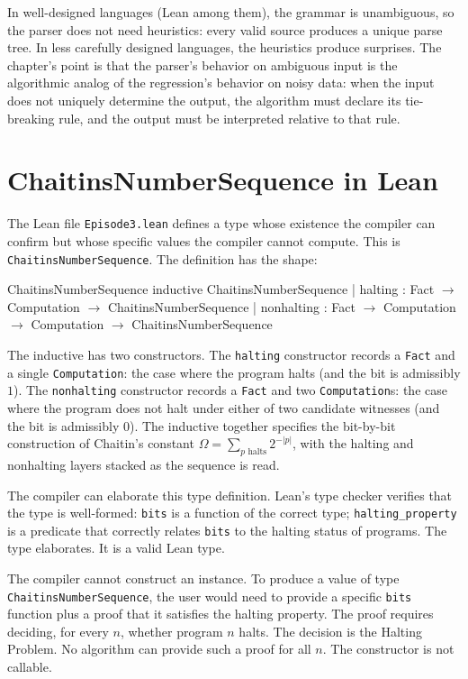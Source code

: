 In well-designed languages (Lean among them), the grammar is
unambiguous, so the parser does not need heuristics: every valid
source produces a unique parse tree. In less carefully designed
languages, the heuristics produce surprises. The chapter's point is
that the parser's behavior on ambiguous input is the algorithmic
analog of the regression's behavior on noisy data: when the input
does not uniquely determine the output, the algorithm must declare
its tie-breaking rule, and the output must be interpreted relative
to that rule.

\section{ChaitinsNumberSequence in Lean}
\label{se:chaitinsnumbersequence-in-lean}

The Lean file \texttt{Episode3.lean} defines a type whose existence the
compiler can confirm but whose specific values the compiler cannot
compute. This is \texttt{ChaitinsNumberSequence}. The definition has the
shape:

\begin{leanexcerpt}{ChaitinsNumberSequence}
inductive ChaitinsNumberSequence
  | halting    : Fact $\to$ Computation $\to$ ChaitinsNumberSequence
  | nonhalting : Fact $\to$ Computation $\to$ Computation
               $\to$ ChaitinsNumberSequence
\end{leanexcerpt}

The inductive has two constructors. The \texttt{halting} constructor
records a \texttt{Fact} and a single \texttt{Computation}: the case
where the program halts (and the bit is admissibly $1$). The
\texttt{nonhalting} constructor records a \texttt{Fact} and two
\texttt{Computation}s: the case where the program does not halt under
either of two candidate witnesses (and the bit is admissibly $0$). The
inductive together specifies the bit-by-bit construction of Chaitin's
constant $\Omega = \sum_{p \text{ halts}} 2^{-|p|}$, with the halting
and nonhalting layers stacked as the sequence is read.

The compiler can elaborate this type definition. Lean's type checker
verifies that the type is well-formed: \texttt{bits} is a function of
the correct type; \texttt{halting\_property} is a predicate that
correctly relates \texttt{bits} to the halting status of programs. The
type elaborates. It is a valid Lean type.

The compiler cannot construct an instance. To produce a value of type
\texttt{ChaitinsNumberSequence}, the user would need to provide a
specific \texttt{bits} function plus a proof that it satisfies the
halting property. The proof requires deciding, for every $n$, whether
program $n$ halts. The decision is the Halting Problem. No algorithm can
provide such a proof for all $n$. The constructor is not callable.


